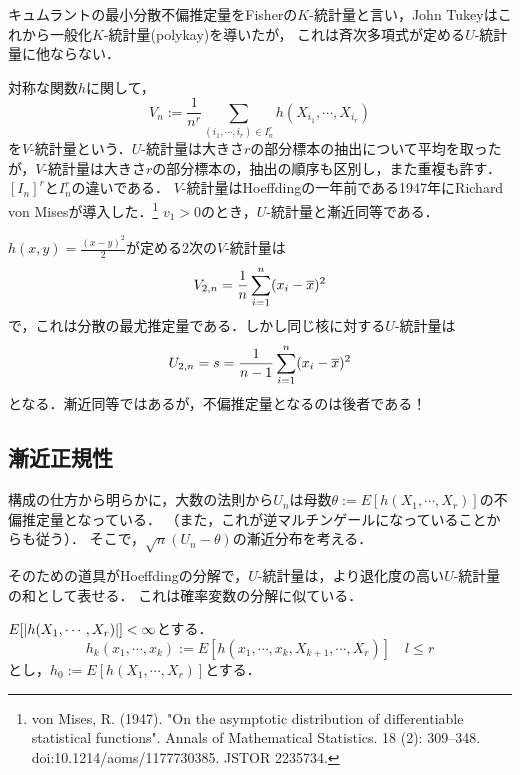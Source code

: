 \documentclass[uplatex,dvipdfmx]{jsreport}
\begin{document}
\begin{example}[K-statistic]
    キュムラントの最小分散不偏推定量をFisherの$K$-統計量と言い，John Tukeyはこれから一般化$K$-統計量(polykay)を導いたが，
    これは斉次多項式が定める$U$-統計量に他ならない．
\end{example}

\begin{example}[V-statistic]
    対称な関数$h$に関して，
    \[V_n:=\frac{1}{n^r}\sum_{(i_1,\cdots,i_r)\in I_n^r}h(X_{i_1},\cdots,X_{i_r})\]
    を$V$-統計量という．$U$-統計量は大きさ$r$の部分標本の抽出について平均を取ったが，$V$-統計量は大きさ$r$の部分標本の，抽出の順序も区別し，また重複も許す．$[I_n]^r$と$I_n^r$の違いである．
    $V$-統計量はHoeffdingの一年前である1947年にRichard von Misesが導入した．\footnote{von Mises, R. (1947). "On the asymptotic distribution of differentiable statistical functions". Annals of Mathematical Statistics. 18 (2): 309–348. doi:10.1214/aoms/1177730385. JSTOR 2235734.}
    $v_1>0$のとき，$U$-統計量と漸近同等である．

    $h(x,y)=\frac{(x-y)^2}{2}$が定める2次の$V$-統計量は
    \[V_{2,n}=\frac{1}{n}\sum^n_{i=1}(x_i-\overline{x})^2\]
    で，これは分散の最尤推定量である．しかし同じ核に対する$U$-統計量は
    \[U_{2,n}=s=\frac{1}{n-1}\sum^n_{i=1}(x_i-\overline{x})^2\]
    となる．漸近同等ではあるが，不偏推定量となるのは後者である！
\end{example}

\subsection{漸近正規性}

\begin{tcolorbox}[colframe=ForestGreen, colback=ForestGreen!10!white,breakable,colbacktitle=ForestGreen!40!white,coltitle=black,fonttitle=\bfseries\sffamily,
title=]
    構成の仕方から明らかに，大数の法則から$U_n$は母数$\theta:=E[h(X_1,\cdots,X_r)]$の不偏推定量となっている．
    （また，これが逆マルチンゲールになっていることからも従う）．
    そこで，$\sqrt{n}(U_n-\theta)$の漸近分布を考える．

    そのための道具がHoeffdingの分解で，$U$-統計量は，より退化度の高い$U$-統計量の和として表せる．
    これは確率変数の分解に似ている．
\end{tcolorbox}

\begin{notation}
    $E[\lvert h(X_1,\cdots,X_r)\rvert]<\infty$とする．
    \[h_k(x_1,\cdots,x_k):=E[h(x_1,\cdots,x_k,X_{k+1},\cdots,X_r)]\quad l\le r\]
    とし，$h_0:=E[h(X_1,\cdots,X_r)]$とする．
\end{notation}
\end{document}
